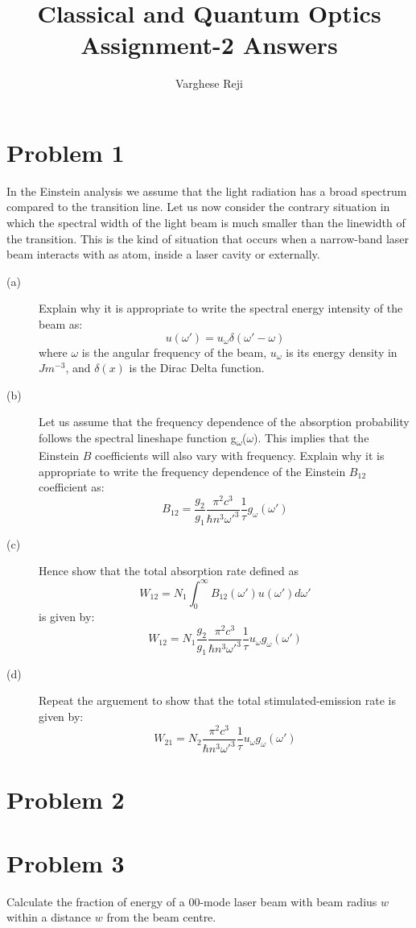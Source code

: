 \documentclass[a4paper,11pt]{article}
\author{Varghese Reji}
\date{}
\title{Classical and Quantum Optics\\\medskip
\large Assignment-2 Answers}
\begin{document}
\maketitle

\section*{Problem 1}
\label{sec:orgf7390ea}
In the Einstein analysis we assume that the light radiation has a broad spectrum compared to the transition line. Let us now consider the contrary situation in which the spectral width of the light beam is much smaller than the linewidth of the transition. This is the kind of situation that occurs when a narrow-band laser beam interacts with as atom, inside a laser cavity or externally.
\begin{description}
\item[{(a)}] Explain why it is appropriate to write the spectral energy intensity of the beam as:
$$u(\omega') = u_\omega\delta(\omega'-\omega)$$
where \(\omega\) is the angular frequency of the beam, \(u_\omega\) is its energy density in \(Jm^{-3}\), and \(\delta(x)\) is the Dirac Delta function.
\item[{(b)}] Let us assume that the frequency dependence of the absorption probability follows the spectral lineshape function g\textsubscript{\(\omega\)}(\(\omega\)). This implies that the Einstein \(B\) coefficients will also vary with frequency. Explain why it is appropriate to write the frequency dependence of the Einstein \(B_{12}\) coefficient as:
$$B_{12} = \frac{g_2}{g_1} \frac{\pi^2c^3}{\hbar n^3\omega'^3} \frac{1}{\tau} g_{\omega}(\omega')$$
\item[{(c)}] Hence show that the total absorption rate defined as
$$W_{12} = N_1\int_{0}^{\infty} B_{12}(\omega') u(\omega')d\omega'$$
is given by:
$$W_{12} = N_1 \frac{g_2}{g_1} \frac{\pi^2c^3}{\hbar n^3\omega'^3} \frac{1}{\tau} u_{\omega}g_{\omega}(\omega')$$
\item[{(d)}] Repeat the arguement to show that the total stimulated-emission rate is given by:
$$W_{21} = N_2 \frac{\pi^2c^3}{\hbar n^3\omega'^3} \frac{1}{\tau} u_{\omega}g_{\omega}(\omega')$$
\end{description}

\section*{Problem 2}
\label{sec:org3cdf176}

\newpage
\section*{Problem 3}
\label{sec:orgff7a50e}
Calculate the fraction of energy of a 00-mode laser beam with beam radius \(w\) within a distance \(w\) from the beam centre.
\end{document}
